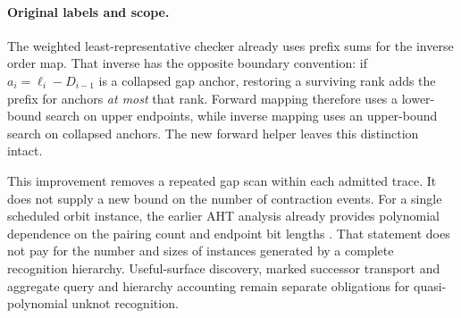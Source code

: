 \paragraph{Original labels and scope.}
The weighted least-representative checker already uses prefix sums for the
inverse order map. That inverse has the opposite boundary convention:
if $a_i=\ell_i-D_{i-1}$ is a collapsed gap anchor, restoring a surviving
rank adds the prefix for anchors \emph{at most} that rank. Forward mapping
therefore uses a lower-bound search on upper endpoints, while inverse
mapping uses an upper-bound search on collapsed anchors. The new forward
helper leaves this distinction intact.

This improvement removes a repeated gap scan within each admitted trace.
It does not supply a new bound on the number of contraction events.
For a single scheduled orbit instance, the earlier AHT analysis already
provides polynomial dependence on the pairing count and endpoint bit
lengths \cite{aht-orbits}. That statement does not pay for the number and
sizes of instances generated by a complete recognition hierarchy.
Useful-surface discovery, marked successor transport and aggregate query
and hierarchy accounting remain separate obligations for quasi-polynomial
unknot recognition.


